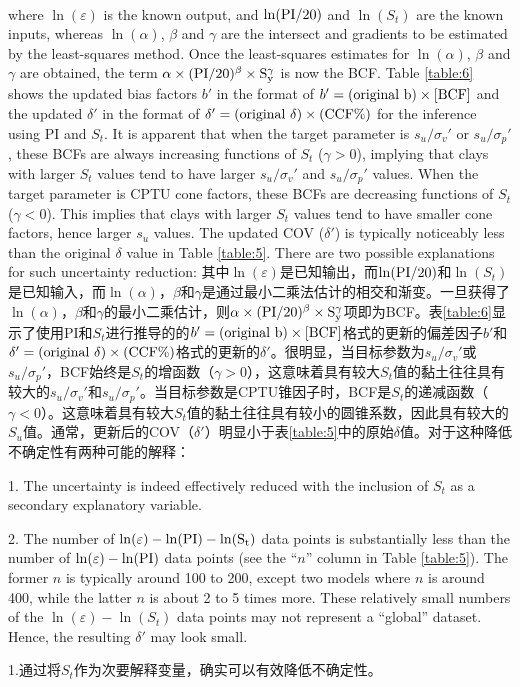 \begin{Parallel}{0.60\textwidth}{}
\begin{align}
        \label{equation:9}
    \end{align}
    \ParallelLText
    {
        where $\ln(\varepsilon)$ is the known output, and $\ln(\rm{PI}/20)$ and $\ln(S_t)$ are the known inputs, whereas $\ln(\alpha)$, $\beta$ and $\gamma$ are the intersect and gradients to be estimated by the least-squares method. Once the least-squares estimates for $\ln(\alpha)$, $\beta$ and $\gamma$ are obtained, the term $\alpha\times{}(\rm{PI}/20)^\beta\times{}S_y^\gamma$ is now the BCF. Table \ref{table:6} shows the updated bias factors $b'$ in the format of $b'=(\rm{original}~b)\times{}[BCF]$ and the updated $\delta'$ in the format of $\delta'=(\rm{original}~\delta)\times{}(\rm{CCF}\%)$ for the inference using PI and $S_t$. It is apparent that when the target parameter is $s_u/\sigma_v'$ or $s_u/\sigma_p'$, these BCFs are always increasing functions of $S_t$ ($\gamma>0$), implying that clays with larger $S_t$ values tend to have larger $s_u/\sigma_v'$ and $s_u/\sigma_p'$ values. When the target parameter is CPTU cone factors, these BCFs are decreasing functions of $S_t$ ($\gamma<0$). This implies that clays with larger $S_t$ values tend to have smaller cone factors, hence larger $s_u$ values. The updated COV ($\delta'$) is typically noticeably less than the original $\delta$ value in Table \ref{table:5}. There are two possible explanations for such uncertainty reduction:
    }
    \ParallelRText
    {
        其中$\ln(\varepsilon)$是已知输出，而$\ln(\rm{PI}/20)$和$\ln(S_t)$是已知输入，而$\ln(\alpha)$，$\beta$和$\gamma$是通过最小二乘法估计的相交和渐变。一旦获得了$\ln(\alpha)$，$\beta$和$\gamma$的最小二乘估计，则$\alpha\times{}(\rm{PI}/20)^\beta\times{}S_y^\gamma$项即为BCF。表\ref{table:6}显示了使用PI和$S_t$进行推导的的$b'=(\rm{original}~b)\times{}[BCF]$格式的更新的偏差因子$b'$和$\delta'=(\rm{original}~\delta)\times{}(\rm{CCF}\%)$格式的更新的$\delta'$。很明显，当目标参数为$s_u/\sigma_v'$或$s_u/\sigma_p'$，BCF始终是$S_t$的增函数（$\gamma>0$），这意味着具有较大$S_t$值的黏土往往具有较大的$s_u/\sigma_v'$和$s_u/\sigma_p'$。当目标参数是CPTU锥因子时，BCF是$S_t$的递减函数（$\gamma<0$）。这意味着具有较大$S_t$值的黏土往往具有较小的圆锥系数，因此具有较大的$S_u$值。通常，更新后的COV（$\delta'$）明显小于表\ref{table:5}中的原始$\delta$值。对于这种降低不确定性有两种可能的解释：
    }
    \ParallelPar
    \ParallelLText
    {
        1. The uncertainty is indeed effectively reduced with the inclusion of $S_t$ as a secondary explanatory variable.

        2. The number of $\ln(\varepsilon)-\ln(\rm{PI})-\ln(S_t)$ data points is substantially less than the number of $\ln(\varepsilon)-\ln(\rm{PI})$ data points (see the “$n$” column in Table \ref{table:5}). The former $n$ is typically around 100 to 200, except two models where $n$ is around 400, while the latter $n$ is about 2 to 5 times more. These relatively small numbers of the $\ln(\varepsilon)-\ln(S_t)$ data points may not represent a “global” dataset. Hence, the resulting $\delta'$ may look small.
    }
    \ParallelRText
    {
        1.通过将$S_t$作为次要解释变量，确实可以有效降低不确定性。

}
\end{Parallel}
